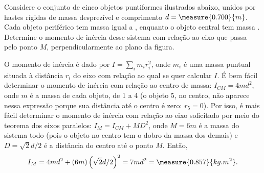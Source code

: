 \begin{question}
	Considere o conjunto de cinco objetos puntiformes ilustrados abaixo, unidos por hastes rígidas de massa desprezível e comprimento $d = \measure{0.700}{m}$.
	Cada objeto periférico tem massa igual a , enquanto o objeto central tem massa .
	Determine o momento de inércia desse sistema com relação ao eixo que passa pelo ponto $M$, perpendicularmente ao plano da figura.


	\begin{answer}
	\end{answer}

	\begin{solution}
		O momento de inércia é dado por $I = \sum_i m_i r_i^2$, onde $m_i$ é uma massa puntual situada à distância $r_i$ do eixo com relação ao qual se quer calcular $I$.
		É bem fácil determinar o momento de inércia com relação ao centro de massa: $I_{CM} = 4md^2$, onde $m$ é a massa de cada objeto, de 1 a 4 (o objeto 5, no centro, não aparece nessa expressão porque sua distância até o centro é zero: $r_5 = 0$).
		Por isso, é mais fácil determinar o momento de inércia com relação ao eixo solicitado por meio do teorema dos eixos paralelos: $I_M = I_{CM} + MD^2$, onde $M = 6m$ é a massa do sistema todo (pois o objeto no centro tem o dobro da massa dos demais) e $D = \sqrt{2}d/2$ é a distância do centro até o ponto $M$.
		Então,
		\begin{equation*}
			I_M = 4md^2 + (6m)\left(\sqrt{2}d/2\right)^2 = 7md^2 = \measure{0.857}{kg.m^2}.
		\end{equation*}
	\end{solution}
\end{question}

